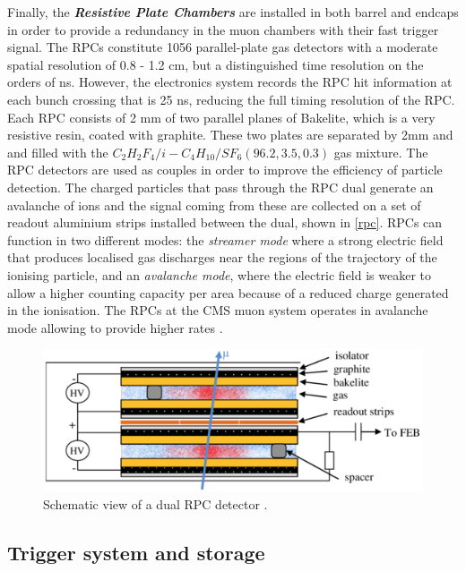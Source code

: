 Finally, the \emph{\textbf{Resistive Plate Chambers}} are installed in both barrel and endcaps in order to provide a redundancy in the muon chambers with their fast trigger signal. The RPCs constitute 1056 parallel-plate gas detectors with a moderate spatial resolution of 0.8 - 1.2 cm, but a distinguished time resolution on the orders of ns. However, the electronics system records the RPC hit information at each bunch crossing that is 25 ns, reducing the full timing resolution of the RPC. Each RPC consists of 2 mm of two parallel planes of Bakelite, which is a very resistive resin, coated with graphite. These two plates are separated by 2mm and and filled with the $C_2H_2F_4/i-C_4H_{10}/SF_6 (96.2, 3.5, 0.3)$ gas mixture. The RPC detectors are used as couples in order to improve the efficiency of particle detection. The charged particles that pass through the RPC dual generate an avalanche of ions and the signal coming from these are collected on a set of readout aluminium strips installed between the dual, shown in \autoref{rpc}. RPCs can function in two different modes: the \emph{streamer mode} where a strong electric field that produces localised gas discharges near the regions of the trajectory of the ionising particle, and an \emph{avalanche mode}, where the electric field is weaker to allow a higher counting capacity per area because of a reduced charge generated in the ionisation. The RPCs at the CMS muon system operates in avalanche mode allowing to provide higher rates \cite{Sirunyan_2018}.

\begin{figure}[ht]
	\centering
	\includegraphics[width=\textwidth]{MSc_Thesis/fig/rpc.png}
	\vspace{2mm}
	\caption[Schematic view of a dual RPC detector.]{Schematic view of a dual RPC detector \cite{IanCrotty}.}
	\label{rpc}
\end{figure}

\subsection{Trigger system and storage}


